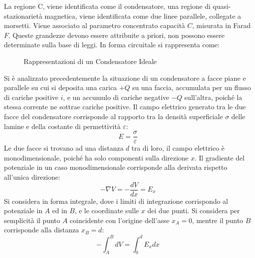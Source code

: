 \documentclass{article}
\numberwithin{equation}{subsection}
\begin{document}
La regione C, viene identificata come il condensatore, una regione di quasi-stazionarietà magnetica, viene identificata come due linee parallele, collegate a morsetti. Viene 
associato al parametro concentrato capacità $C$, misurata in Farad $F$. Queste grandezze devono essere attribuite a priori, non possono essere determinate sulla base di leggi. 
In forma circuitale si rappresenta come:
\begin{figure}[H]%
    \centering
    \qquad
    \caption{Rappresentazioni di un Condensatore Ideale}
    \label{fig:rappresentazione-condensatore}
\end{figure}


Si è analizzato precedentemente la situazione di un condensatore a facce piane e parallele su cui si deposita una carica $+Q$ su una faccia, accumulata per un flusso di 
cariche positive $i$, e un accumulo di cariche negative $-Q$ sull'altra, poiché la stessa corrente ne sottrae cariche positive. Il campo elettrico generato tra le due 
facce del condensatore corrisponde al rapporto tra la densità superficiale $\sigma$ delle lamine e della costante di permettività $\varepsilon$:
\begin{equation*}
    E=\displaystyle\frac{\sigma}{\varepsilon}
\end{equation*}
Le due facce si trovano ad una distanza $d$ tra di loro, il campo elettrico è monodimensionale, poiché ha solo componenti sulla direzione $x$. Il gradiente del potenziale 
in un caso monodimensionale corrisponde alla derivata rispetto all'unica direzione:
\begin{equation*}
    -\nabla V=-\displaystyle\frac{dV}{dx}=E_x
\end{equation*}
Si considera in forma integrale, dove i limiti di integrazione corrispondo al potenziale in $A$ ed in $B$, e le coordinate sulle $x$ dei due punti. Si considera per semplicità 
il punto $A$ coincidente con l'origine dell'asse $x_A=0$, mentre il punto $B$ corrisponde alla distanza $x_B=d$:
\begin{equation*}
    -\displaystyle\int_{A}^BdV=\int_0^dE_xdx
\end{equation*}
\end{document}
